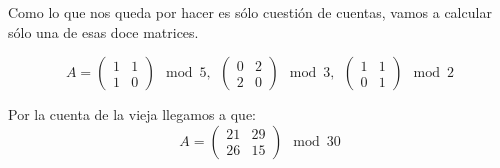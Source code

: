 \begin{problem}[6]
Como lo que nos queda por hacer es sólo cuestión de cuentas, vamos a calcular sólo una de esas doce matrices.

\[A =  \left( \begin{array}{cc}1 & 1 \\ 1 & 0 \end{array}\right) \mod 5 , \ \  \left( \begin{array}{cc}0 & 2 \\ 2 & 0 \end{array}\right) \mod 3, \ \  \left( \begin{array}{cc}1 & 1 \\ 0 & 1 \end{array}\right) \mod 2\]

Por la cuenta de la vieja llegamos a que:
\[ A = \left( \begin{array}{cc}21 & 29 \\ 26 & 15 \end{array}\right) \mod 30\]
\end{problem}

